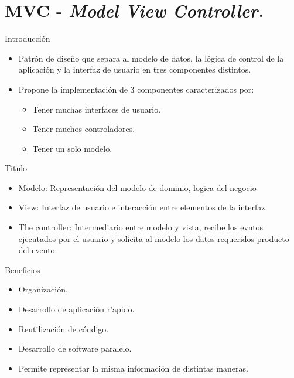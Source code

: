 \section{MVC - \emph{Model View Controller.}}
\begin{frame}{Introducci\'on}
\begin{block}{}
	\begin{itemize}
		\item Patr\'on de diseño que separa al modelo de datos, la lógica de control de la aplicaci\'on y la interfaz de usuario en tres componentes distintos.
		\item Propone la implementaci\'on de 3 componentes caracterizados por:
			\begin{itemize}
				\item Tener muchas interfaces de usuario.
				\item Tener muchos controladores.
				\item Tener un solo modelo.
			\end{itemize}
	\end{itemize}
\end{block}
\end{frame}

\begin{frame}{Titulo}
	\begin{itemize}
		\item Modelo: Representaci\'on del modelo de dominio,  logica del negocio
		\item View: Interfaz de usuario e interacci\'on entre elementos de la interfaz.
		\item The controller: Intermediario entre modelo y vista, recibe los evntos ejecutados por el usuario y solicita al modelo los datos requeridos producto del evento.
		\end{itemize}
\end{frame}

\begin{frame}{Beneficios}
	\begin{itemize}
		\item Organizaci\'on.
		\item Desarrollo de aplicaci\'on r'apido.
		\item Reutilizaci\'on de c\'ondigo.
		\item Desarrollo de software paralelo.
		\item Permite representar la misma informaci\'on de distintas maneras.

	\end{itemize}
\end{frame}

%
